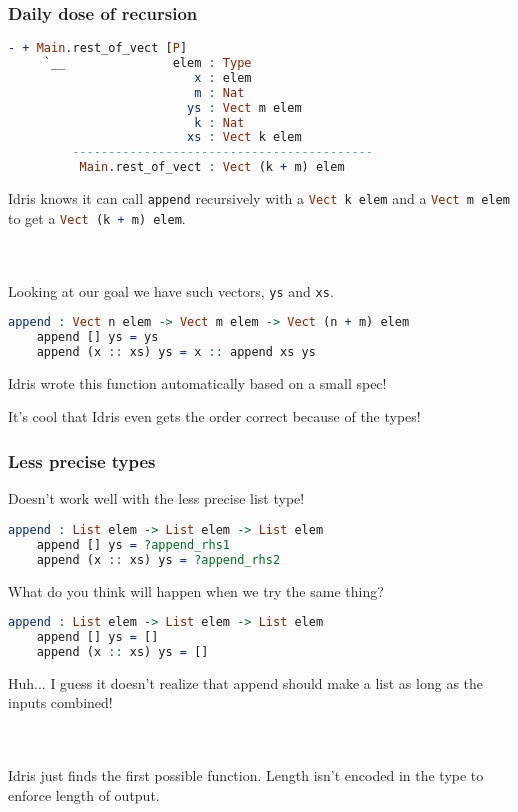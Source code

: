 \documentclass{beamer}
\begin{document}
\begin{frame}[fragile]
  \frametitle{Daily dose of recursion}

  \begin{lstlisting}[language=Idris]
    - + Main.rest_of_vect [P]
     `__               elem : Type
                          x : elem
                          m : Nat
                         ys : Vect m elem
                          k : Nat
                         xs : Vect k elem
         ------------------------------------------
          Main.rest_of_vect : Vect (k + m) elem
  \end{lstlisting}

  \pause
  Idris knows it can call \texttt{append} recursively with a
\lstinline[language=Idris,columns=fixed]{Vect k elem} and a
\lstinline[language=Idris,columns=fixed]{Vect m elem} to get a
\lstinline[language=Idris,columns=fixed]{Vect (k + m) elem}.

  \pause \\~\\

  Looking at our goal we have such vectors, \texttt{ys} and \texttt{xs}.

  \pause
  \begin{lstlisting}[language=Idris]
    append : Vect n elem -> Vect m elem -> Vect (n + m) elem
    append [] ys = ys
    append (x :: xs) ys = x :: append xs ys
  \end{lstlisting}

  \pause
  Idris wrote this function automatically based on a small spec!

  \pause
  It's cool that Idris even gets the order correct because of the types!
\end{frame}

\begin{frame}[fragile]
  \frametitle{Less precise types}

  Doesn't work well with the less precise list type!

  \pause
  \begin{lstlisting}[language=Idris]
    append : List elem -> List elem -> List elem
    append [] ys = ?append_rhs1
    append (x :: xs) ys = ?append_rhs2
  \end{lstlisting}

  What do you think will happen when we try the same thing?

  \pause
  \begin{lstlisting}[language=Idris]
    append : List elem -> List elem -> List elem
    append [] ys = []
    append (x :: xs) ys = []
  \end{lstlisting}

  Huh... I guess it doesn't realize that append should make a list as long as the inputs combined!

  \pause \\~\\
  Idris just finds the first possible function. Length isn't encoded in the type to enforce length of output.
\end{frame}
\end{document}
